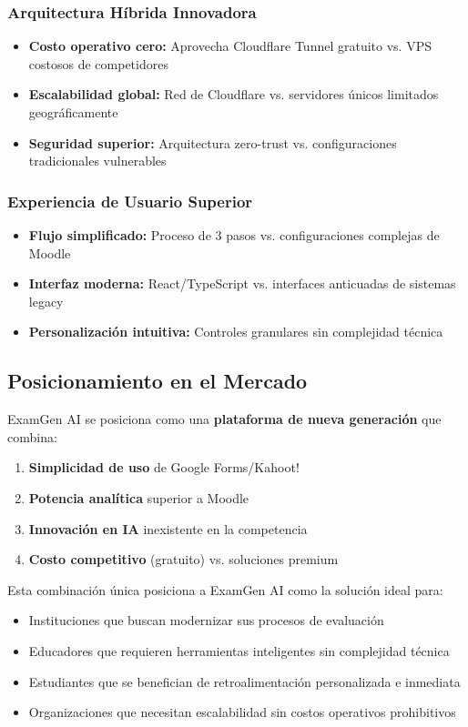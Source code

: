 \documentclass[12pt,a4paper]{report}
\begin{document}
\subsubsection{Arquitectura Híbrida Innovadora}

\begin{itemize}
\item \textbf{Costo operativo cero:} Aprovecha Cloudflare Tunnel gratuito vs. VPS costosos de competidores
\item \textbf{Escalabilidad global:} Red de Cloudflare vs. servidores únicos limitados geográficamente
\item \textbf{Seguridad superior:} Arquitectura zero-trust vs. configuraciones tradicionales vulnerables
\end{itemize}

\subsubsection{Experiencia de Usuario Superior}

\begin{itemize}
\item \textbf{Flujo simplificado:} Proceso de 3 pasos vs. configuraciones complejas de Moodle
\item \textbf{Interfaz moderna:} React/TypeScript vs. interfaces anticuadas de sistemas legacy
\item \textbf{Personalización intuitiva:} Controles granulares sin complejidad técnica
\end{itemize}

\subsection{Posicionamiento en el Mercado}

ExamGen AI se posiciona como una \textbf{plataforma de nueva generación} que combina:

\begin{enumerate}
\item \textbf{Simplicidad de uso} de Google Forms/Kahoot!
\item \textbf{Potencia analítica} superior a Moodle
\item \textbf{Innovación en IA} inexistente en la competencia
\item \textbf{Costo competitivo} (gratuito) vs. soluciones premium
\end{enumerate}

Esta combinación única posiciona a ExamGen AI como la solución ideal para:
\begin{itemize}
\item Instituciones que buscan modernizar sus procesos de evaluación
\item Educadores que requieren herramientas inteligentes sin complejidad técnica
\item Estudiantes que se benefician de retroalimentación personalizada e inmediata
\item Organizaciones que necesitan escalabilidad sin costos operativos prohibitivos
\end{itemize}
\end{document}
